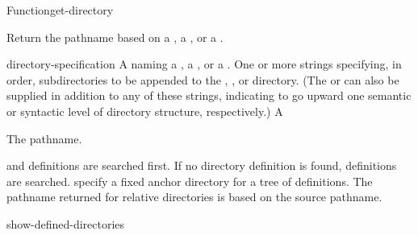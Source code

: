 \documentclass[10pt,twoside,english,pdftex]{article}
\begin{document}
\begin{functiondoc}{Function}{get-directory}{
     
    \returns{} }
%

\fnsyntax 

\fnpurpose Return the pathname based on a , a
, or a .

\fnpackage {}

\fnmodule {}

\fnargs
\begin{args}{directory-specification}
\arg[name] A  naming a , a
, or a .
\arg[subdirectories] One or more strings specifying, in order, subdirectories
to be appended to the , , or
 directory. (The   or  can
also be supplied in addition to any of these strings, indicating to go upward
one semantic or syntactic level of directory structure, respectively.)
\arg[pathname] A 
\end{args}

\fnreturns The pathname.

\fnerrors
\relativedircircularity

\fndescription {} and  definitions are
searched first.  If no  directory definition is found,
 definitions are searched.   specify a
fixed anchor directory for a tree of  definitions.
The pathname returned for relative directories is based on the source pathname.

\begin{alsos}{show-defined-directories}
\end{alsos}

\fnexamples


\end{functiondoc}
\end{document}
